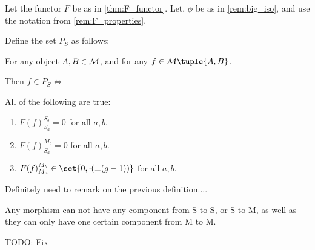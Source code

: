 \begin{definition} \label{def:unholy}
    Let the functor \( F \) be as in \autoref{thm:F_functor}.  Let, \( \phi \) be as in \autoref{rem:big_iso}, and use the notation from \autoref{rem:F_properties}.

    Define the set \( P_S \) as follows:

    For any object \( A, B \in {\mathcal{M}} \), and for any \( f \in \Mc\tuple{A, B} \).

    Then \( f \in P_S \iff \)

    All of the following are true:
    \begin{enumerate}
        \item \( F(f)_{S_a}^{S_b} = 0 \) for all \( a, b \).
        \item \( F(f)_{S_a}^{M_b} = 0 \) for all  \( a, b \).
        \item \( F(f)_{M_a}^{M_b} \in \set{0, \cdot(\pm (g - 1))} \) for all \( a, b \).
    \end{enumerate}
\end{definition}

\begin{remark}
    Definitely need to remark on the previous definition.... 
    
    Any morphism can not have any component from S to S, or S to M, as well as they can only have one certain component from M to M.

    TODO: Fix
\end{remark}

